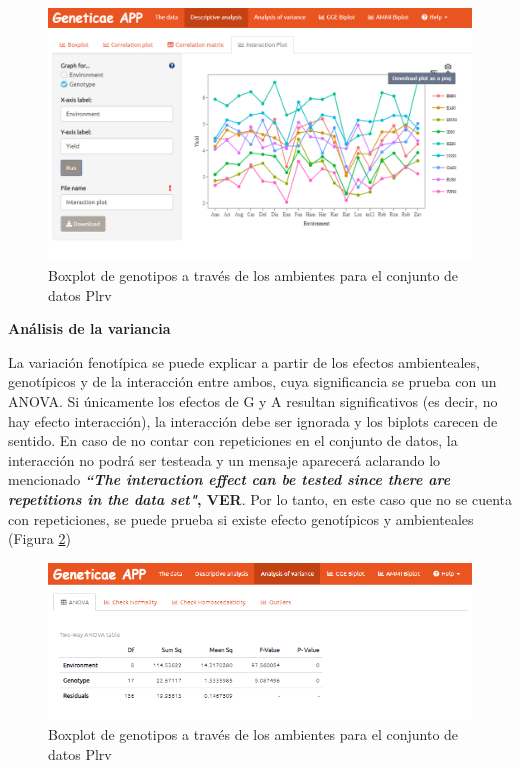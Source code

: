 \begin{figure}[H]
	\begin{center}
		\includegraphics[width=16cm]{./Graficos/int_plot.png}
	\end{center}
	\caption{Boxplot de genotipos a través de los ambientes para el conjunto de datos Plrv}
	\label{fig:figdesc4}
\end{figure}



\textbf{Análisis de la variancia}


La variación fenotípica se puede explicar a partir de los efectos ambienteales, genotípicos y de la interacción entre ambos, cuya significancia se prueba con un ANOVA. Si únicamente los efectos de G y A resultan significativos (es decir, no hay efecto interacción), la interacción debe ser ignorada y los biplots carecen de sentido. En caso de no contar con repeticiones en el conjunto de datos, la interacción no podrá ser testeada y un mensaje aparecerá aclarando lo mencionado\textbf{ \emph{``The interaction effect can be tested since there are repetitions in the data set"}, VER}. Por lo tanto, en este caso que no se cuenta con repeticiones, se puede prueba si existe efecto genotípicos y ambienteales (Figura \ref{fig:fig438})

\begin{figure}[H]
	\begin{center}
		\includegraphics[width=16cm]{./Graficos/ANOVA.png}
	\end{center}
	\caption{Boxplot de genotipos a través de los ambientes para el conjunto de datos Plrv}
	\label{fig:fig438}
\end{figure}


